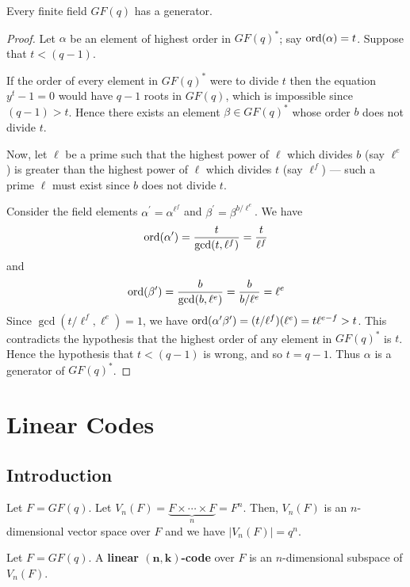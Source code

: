 \begin{thmbox}
    \begin{theorem}
        Every finite field $ GF(q) $ has a generator.
    \end{theorem}
\end{thmbox}

\begin{proof}
    Let $ \alpha $ be an element of highest order in $ GF(q)^* $;
    say $ \operatorname{ord}(\alpha)=t $. Suppose that $ t<(q-1) $.

    If the order of every element in $ GF(q)^* $ were to divide $ t $ then the equation
    $ y^t-1=0 $ would have $ q-1 $ roots in $ GF(q) $, which is impossible
    since $ (q-1)>t $. Hence there exists an element $ \beta\in GF(q)^* $
    whose order $ b $ does not divide $ t $.

    Now, let $ \ell $ be a prime such that the highest power of $ \ell $
    which divides $ b $ (say $ \ell^e $) is greater than the highest
    power of $ \ell $ which divides $ t $ (say $ \ell^f $) --- such a prime
    $ \ell $ must exist since $ b $ does not divide $ t $.

    Consider the field elements $ \alpha^{\prime}=\alpha^{\ell^f} $
    and $ \beta^{\prime}=\beta^{b/\ell^e} $. We have
    \[ \operatorname{ord}(\alpha^{\prime})=\frac{t}{\gcd(t,\ell^f)} =\frac{t}{\ell^f} \]
    and
    \[ \operatorname{ord}(\beta^{\prime})=\frac{b}{\gcd(b,\ell^e)} =\frac{b}{b/\ell^e}=\ell^e \]
    Since $ \gcd(t/\ell^f,\ell^e)=1 $, we have $ \operatorname{ord}(\alpha^{\prime}\beta^{\prime})=
        (t/\ell^f)(\ell^e)=t\ell^{e-f}>t $. This contradicts the hypothesis
    that the highest order of any element in $ GF(q)^* $ is $ t $. Hence the
    hypothesis that $ t<(q-1) $ is wrong, and so $ t=q-1 $. Thus $ \alpha $
    is a generator of $ GF(q)^* $.
\end{proof}

\chapter{Linear Codes}
\section{Introduction}
Let $ F=GF(q) $. Let $ V_n(F)=\underbrace{F\times\cdots\times F}_{n}=F^n $.
Then, $ V_n(F) $ is an $ n $-dimensional vector space over $ F $ and
we have $ |V_n(F)|=q^n $.

\begin{defbox}
    \begin{definition}
        Let $ F=GF(q) $.
        A \textbf{linear $ \bm{(n,k)} $-code} over $ F $ is an $ n $-dimensional subspace
        of $ V_n(F) $.
    \end{definition}
\end{defbox}

